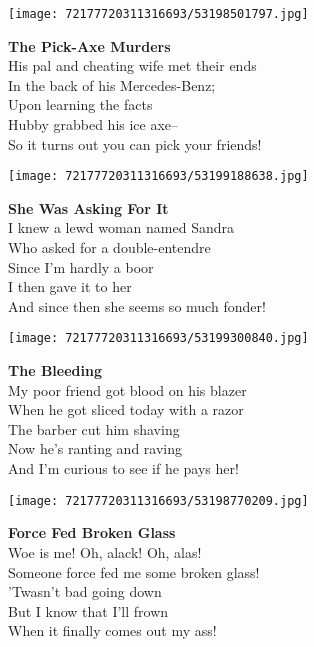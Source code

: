 \documentclass[10pt,letterpaper]{article}
\begin{document}
\begin{center}\texttt{[image: 72177720311316693/53198501797.jpg]}
\end{center}
\begin{center}
\textbf{The Pick-Axe Murders}\\
\vskip 0.2in
His pal and cheating wife met their ends\\
In the back of his Mercedes-Benz;\\
Upon learning the facts\\
Hubby grabbed his ice axe--\\
So it turns out you can pick your friends!\\
\end{center}
\pagebreak

\begin{center}\texttt{[image: 72177720311316693/53199188638.jpg]}
\end{center}
\begin{center}
\textbf{She Was Asking For It}\\
\vskip 0.2in
I knew a lewd woman named Sandra\\
Who asked for a double-entendre\\
Since I'm hardly a boor\\
I then gave it to her\\
And since then she seems so much fonder!\\
\end{center}
\pagebreak

\begin{center}
\texttt{[image: 72177720311316693/53199300840.jpg]}
\end{center}

\begin{center}
\textbf{The Bleeding}\\
\vskip 0.2in
My poor friend got blood on his blazer\\
When he got sliced today with a razor\\
The barber cut him shaving\\
Now he's ranting and raving\\
And I'm curious to see if he pays her!\\
\end{center}
\pagebreak

\begin{center}\texttt{[image: 72177720311316693/53198770209.jpg]}
\end{center}
\begin{center}
\textbf{Force Fed Broken Glass}\\
\vskip 0.2in
Woe is me!  Oh, alack!  Oh, alas!\\
Someone force fed me some broken glass!\\
'Twasn't bad going down\\
But I know that I'll frown\\
When it finally comes out my ass!\\
\end{center}
\pagebreak
\end{document}
